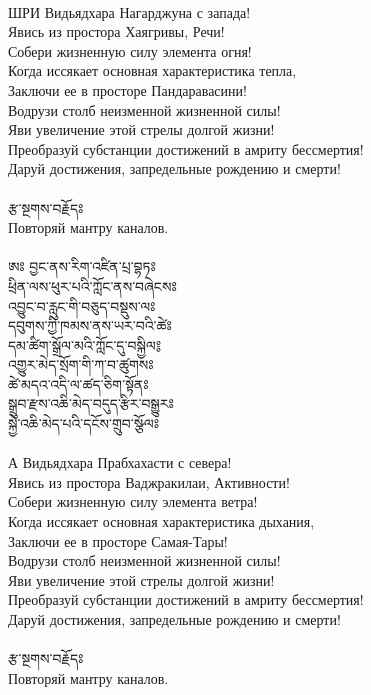 \\
ШРИ   Видьядхара Нагарджуна с запада!\\
Явись из простора Хаягривы, Речи!\\
Собери жизненную силу элемента огня!\\
Когда иссякает основная характеристика тепла,\\
Заключи ее в просторе Пандаравасини!\\
Водрузи столб неизменной жизненной силы!\\
Яви увеличение этой стрелы долгой жизни!\\
Преобразуй субстанции достижений в амриту бессмертия!\\
Даруй достижения, запредельные рождению и смерти!\\
\\
{\ti རྩ་སྔགས་བརྗོདཿ }\\
Повторяй мантру каналов.\\
\\
{\ti ཨཿ བྱང་ནས་རིག་འཛིན་པྲ་བྷཏཿ \\
ཕྲིན་ལས་ཕུར་པའི་ཀློང་ནས་བཞེངསཿ \\
འབྱུང་བ་རླུང་གི་བཅུད་བསྡུས་ལཿ \\
དབུགས་ཀྱི་ཁམས་ནས་ཡར་བའི་ཚེཿ \\
དམ་ཚིག་སྒྲོལ་མའི་ཀློང་དུ་བསྐྱིལ༔ \\
འགྱུར་མེད་སྲོག་གི་ཀ་བ་ཚུགསཿ \\
ཚེ་མདའ་འདི་ལ་ཚད་ཅིག་སྟོནཿ \\
སྒྲུབ་རྫས་འཆི་མེད་བདུད་རྩིར་བསྒྱུརཿ\\ 
སྐྱེ་འཆི་མེད་པའི་དངོས་གྲུབ་སྩོལཿ} \\
\\
А   Видьядхара Прабхахасти с севера!\\
Явись из простора Ваджракилаи, Активности!\\
Собери жизненную силу элемента ветра!\\
Когда иссякает основная характеристика дыхания,\\
Заключи ее в просторе Самая-Тары!\\
Водрузи столб неизменной жизненной силы!\\
Яви увеличение этой стрелы долгой жизни!\\
Преобразуй субстанции достижений в амриту бессмертия!\\
Даруй достижения, запредельные рождению и смерти!\\
\\
{\ti རྩ་སྔགས་བརྗོདཿ}\\
Повторяй мантру каналов.\\
